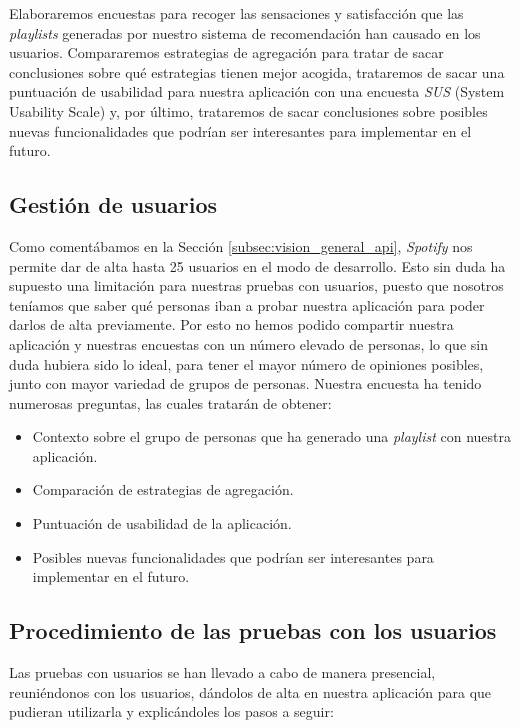 Elaboraremos encuestas para recoger las sensaciones y satisfacción
que las \textit{playlists} generadas por nuestro sistema de recomendación han causado en los usuarios. Compararemos estrategias de agregación para tratar de sacar conclusiones
sobre qué estrategias tienen mejor acogida, trataremos de sacar una puntuación de usabilidad para nuestra aplicación 
con una encuesta \textit{SUS} (System Usability Scale) y, por último, trataremos de sacar conclusiones sobre posibles nuevas funcionalidades que podrían ser interesantes 
para implementar en el futuro.

\subsection{Gestión de usuarios\label{SEC:GESTION_USUARIOS}}

Como comentábamos en la Sección \ref{subsec:vision_general_api}, \textit{Spotify} nos permite dar de alta hasta 25 usuarios en el modo de desarrollo. Esto sin duda 
ha supuesto una limitación para nuestras pruebas con usuarios, puesto que nosotros teníamos que saber qué personas
iban a probar nuestra aplicación para poder darlos de alta previamente. Por esto no hemos podido compartir nuestra aplicación y nuestras
encuestas con un número elevado de personas, lo que sin duda hubiera sido lo ideal, para tener el mayor número de opiniones posibles, junto con mayor 
variedad de grupos de personas. Nuestra encuesta ha tenido numerosas preguntas, las cuales tratarán de obtener:

\begin{itemize}
    \item Contexto sobre el grupo de personas que ha generado una \textit{playlist} con nuestra aplicación.
    \item Comparación de estrategias de agregación.
    \item Puntuación de usabilidad de la aplicación.
    \item Posibles nuevas funcionalidades que podrían ser interesantes para implementar en el futuro.
\end{itemize}

\subsection{Procedimiento de las pruebas con los usuarios\label{SEC:PROCEDIMIENTO}}

Las pruebas con usuarios se han llevado a cabo de manera presencial, reuniéndonos con los usuarios, dándolos de alta en nuestra aplicación para que pudieran utilizarla y 
explicándoles los pasos a seguir:

